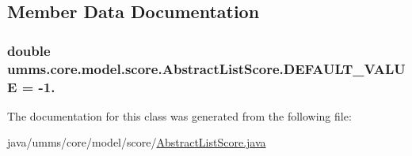 \subsection{Member Data Documentation}
\hypertarget{classumms_1_1core_1_1model_1_1score_1_1_abstract_list_score_aa86bcb702d7dbe628db084b04c047a54}{
\subsubsection[{D\+E\+F\+A\+U\+L\+T\+\_\+\+V\+A\+L\+U\+E}]{\setlength{\rightskip}{0pt plus 5cm}double umms.\+core.\+model.\+score.\+Abstract\+List\+Score.\+D\+E\+F\+A\+U\+L\+T\+\_\+\+V\+A\+L\+U\+E = -\/1.\hspace{0.3cm}{\ttfamily [static]}}}\label{classumms_1_1core_1_1model_1_1score_1_1_abstract_list_score_aa86bcb702d7dbe628db084b04c047a54}


The documentation for this class was generated from the following file\+:\begin{DoxyCompactItemize}
\item 
java/umms/core/model/score/\hyperlink{_abstract_list_score_8java}{Abstract\+List\+Score.\+java}\end{DoxyCompactItemize}
